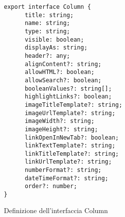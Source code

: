 \begin{verbatim}
export interface Column {
      title: string;
      name: string;
      type: string;
      visible: boolean;
      displayAs: string;
      header?: any;
      alignContent?: string;
      allowHTML?: boolean; 
      allowSearch?: boolean;
      booleanValues?: string[];
      highlightLinks?: boolean;
      imageTitleTemplate?: string;
      imageUrlTemplate?: string;
      imageWidth?: string;
      imageHeight?: string;
      linkOpenInNewTab?: boolean;
      linkTextTemplate?: string;
      linkTitleTemplate?: string;
      linkUrlTemplate?: string;
      numberFormat?: string;
      dateTimeFormat?: string;
      order?: number;
}
\end{verbatim}
\begin{listing}[H]
      \caption{Definizione dell'interfaccia Column}
      \label{listing:column}
\end{listing}
